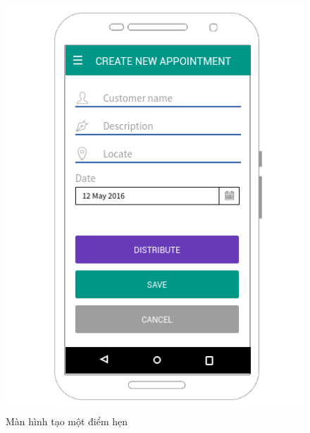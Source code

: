\documentclass[a4paper]{article}
\begin{document}
\begin{figure}[h]
    \includegraphics[scale=0.82]{Mockup/AP_newappointment}
    \centering
    \caption{Màn hình tạo một điểm hẹn}
    \label{fig:AP_newappointment}
\end{figure}
\end{document}
